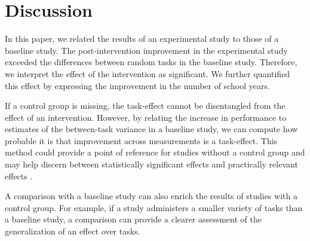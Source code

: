 \documentclass[a4paper]{article}
\newcommand{\DON}	[1] 	{\todo[			linecolor=gray, backgroundcolor=white]	{Don: 	{#1}}}
\newcommand{\DONa}	[1]		{\todo[inline, 	linecolor=gray, backgroundcolor=white]	{Don:	{#1}}}
\newcommand{\GRa}	[1]		{\todo[inline, 	linecolor=gray, backgroundcolor=white]	{Gert: 	{#1}}}
\newcommand{\DON}	[1] 	{}
\newcommand{\DONa}	[1]		{}
\newcommand{\GRa}	[1]		{}
\begin{document}
\section*{Discussion}

In this paper, we related the results of an experimental study to those of a baseline study.
The post-intervention improvement in the experimental study exceeded the differences between random tasks in the baseline study.
Therefore, we interpret the effect of the intervention as significant.
We further quantified this effect by expressing the improvement in the number of school years.




If a control group is missing, the task-effect cannot be disentangled from the effect of an intervention.
However, by relating the increase in performance to estimates of the between-task variance in a baseline study, we can compute how probable it is that improvement across measurements is a task-effect.
This method could provide a point of reference for studies without a control group and may help discern between statistically significant effects and practically relevant effects \cite{hojat2004visitor, fan2001statistical}.

A comparison with a baseline study can also enrich the results of studies with a control group.
For example, if a study administers a smaller variety of tasks than a baseline study, a comparison can provide a clearer assessment of the generalization of an effect over tasks.
\end{document}

